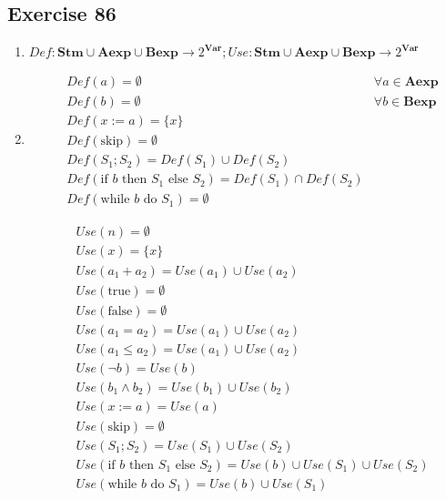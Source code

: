\documentclass[12pt,fleqn]{article}		%
\begin{document}
\subsection{Exercise 86}
\begin{enumerate}
\item $ Def : \textbf{Stm} \cup \textbf{Aexp} \cup \textbf{Bexp} \rightarrow 2^{\textbf{Var}}; Use : \textbf{Stm} \cup \textbf{Aexp} \cup \textbf{Bexp} \rightarrow 2^{\textbf{Var}} $
\item 
\begin{align*}
&Def(a) = \emptyset & \forall a \in \textbf{Aexp}\\
&Def(b) = \emptyset & \forall b \in \textbf{Bexp}\\
&Def(x := a) = \{x\}\\
&Def(\text{skip}) = \emptyset\\
&Def(S_1; S_2) = Def(S_1) \cup Def(S_2)\\
&Def(\text{if } b\text{ then }S_1\text{ else }S_2) = Def(S_1) \cap Def(S_2)\\
&Def(\text{while }b\text{ do } S_1) = \emptyset
\end{align*}

\begin{align*}
&Use(n) = \emptyset\\
&Use(x) = \{x\}\\
&Use(a_1 + a_2) = Use(a_1) \cup Use(a_2)\\
&Use(\text{true}) = \emptyset\\
&Use(\text{false}) = \emptyset\\
&Use(a_1 = a_2) = Use(a_1) \cup Use(a_2)\\
&Use(a_1 \leq a_2) = Use(a_1) \cup Use(a_2)\\
&Use(\lnot b) = Use(b)\\
&Use(b_1 \land b_2) = Use(b_1) \cup Use(b_2)\\
&Use(x := a) = Use(a)\\
&Use(\text{skip}) = \emptyset\\
&Use(S_1; S_2) = Use(S_1) \cup Use(S_2)\\
&Use(\text{if } b\text{ then }S_1\text{ else }S_2) = Use(b) \cup Use(S_1) \cup Use(S_2)\\
&Use(\text{while }b\text{ do } S_1) = Use(b) \cup Use(S_1)
\end{align*}
\end{enumerate}
\end{document}
